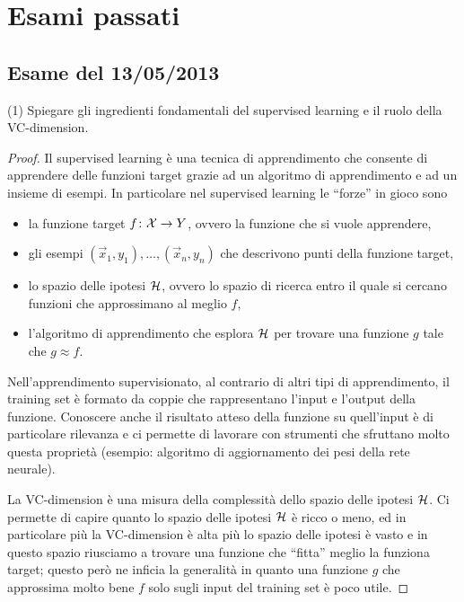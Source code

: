 \documentclass[12pt,a4paper,oneside]{book}
\begin{document}
\section{Esami passati}

\subsection{Esame del 13/05/2013}

\begin{exercise}{(1)}
    Spiegare gli ingredienti fondamentali del supervised learning e il
    ruolo della VC-dimension.
    \begin{proof}
        Il supervised learning è una tecnica di apprendimento che
        consente di apprendere delle funzioni target grazie ad un
        algoritmo di apprendimento e ad un insieme di esempi. In
        particolare nel supervised learning le ``forze'' in gioco sono
        \begin{itemize}
            \item la funzione target $\mathord{f}\colon\mathcal{X}\to Y$, ovvero la
              funzione che si vuole apprendere,
            \item gli esempi $(\vec{x}_1, y_1), \ldots, (\vec{x}_n,
              y_n)$ che descrivono punti della funzione target,
            \item lo spazio delle ipotesi $\mathcal{H}$, ovvero lo spazio di
              ricerca entro il quale si cercano funzioni che
              approssimano al meglio $f$,
            \item l'algoritmo di apprendimento che esplora $\mathcal{H}$ per
              trovare una funzione $g$ tale che $g \approx f$.
        \end{itemize}
    
        Nell'apprendimento supervisionato, al contrario di altri tipi
        di apprendimento, il training set è formato da coppie che
        rappresentano l'input e l'output della funzione. Conoscere
        anche il risultato atteso della funzione su quell'input è di
        particolare rilevanza e ci permette di lavorare con strumenti
        che sfruttano molto questa proprietà (esempio: algoritmo di
        aggiornamento dei pesi della rete neurale).
        
        La VC-dimension è una misura della complessità dello spazio
        delle ipotesi $\mathcal{H}$. Ci permette di capire quanto lo spazio
        delle ipotesi $\mathcal{H}$ è ricco o meno, ed in particolare più la
        VC-dimension è alta più lo spazio delle ipotesi è vasto e in
        questo spazio riusciamo a trovare una funzione che ``fitta''
        meglio la funziona target; questo però ne inficia la
        generalità in quanto una funzione $g$ che approssima molto
        bene $f$ solo sugli input del training set è poco utile.
        

\end{proof}
\end{exercise}
\end{document}
